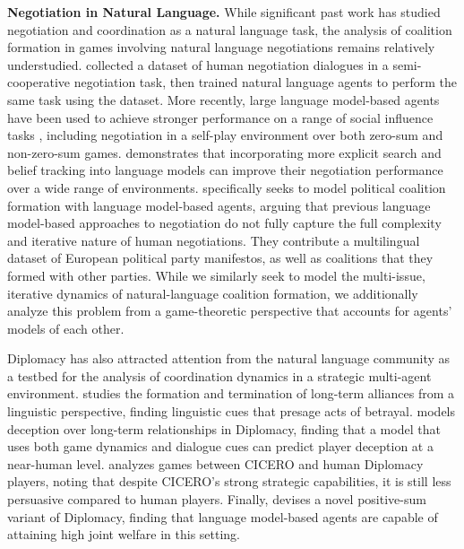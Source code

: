 %
%
%


\textbf{Negotiation in Natural Language.} 
While significant past work has studied negotiation and coordination as a natural language task, the analysis of coalition formation in games involving natural language negotiations remains relatively understudied. \citep{lewis2017deal} collected a dataset of human negotiation dialogues in a semi-cooperative negotiation task, then trained natural language agents to perform the same task using the dataset. More recently, large language model-based agents have been used to achieve stronger performance on a range of social influence tasks \citep{chawla2023social}, including negotiation in a self-play environment over both zero-sum \citep{fu2023improving} and non-zero-sum \citep{liao2024efficacy} games. \citep{gandhi2023strategic} demonstrates that incorporating more explicit search and belief tracking into language models can improve their negotiation performance over a wide range of environments. \citep{moghimifar2024modelling} specifically seeks to model political coalition formation with language model-based agents, arguing that previous language model-based approaches to negotiation do not fully capture the full complexity and iterative nature of human negotiations. They contribute a multilingual dataset of European political party manifestos, as well as coalitions that they formed with other parties. While we similarly seek to model the multi-issue, iterative dynamics of natural-language coalition formation, we additionally analyze this problem from a game-theoretic perspective that accounts for agents' models of each other.

Diplomacy has also attracted attention from the natural language community as a testbed for the analysis of coordination dynamics in a strategic multi-agent environment. \citep{niculae-etal-2015-linguistic} studies the formation and termination of long-term alliances from a linguistic perspective, finding linguistic cues that presage acts of betrayal. \citep{peskov2020takes} models deception over long-term relationships in Diplomacy, finding that a model that uses both game dynamics and dialogue cues can predict player deception at a near-human level. \citep{wongkamjan2024more} analyzes games between CICERO and human Diplomacy players, noting that despite CICERO's strong strategic capabilities, it is still less persuasive compared to human players. Finally, \citep{mukobiwelfare} devises a novel positive-sum variant of Diplomacy, finding that language model-based agents are capable of attaining high joint welfare in this setting.

